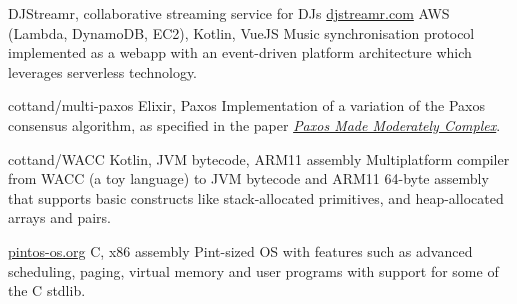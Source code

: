 \begin{entrylist}
    \projEntry
    {DJStreamr, collaborative streaming service for DJs}
    {\href{https://djstreamr.com}{djstreamr.com}}
    {AWS (Lambda, DynamoDB, EC2), Kotlin, VueJS}
    {
        Music synchronisation protocol implemented as a webapp with an event-driven platform
        architecture which leverages serverless technology.
    }

    {cottand/multi-paxos}
    {Elixir, Paxos}
    {
        Implementation of a variation of the Paxos consensus algorithm, as specified in the paper
    \href{https://dl.acm.org/citation.cfm?id=2673577}{\textit{Paxos Made Moderately Complex}}.
    }

    {cottand/WACC}
    {Kotlin, JVM bytecode, ARM11 assembly}
    {
        Multiplatform compiler from WACC (a toy language) to JVM bytecode and ARM11 64-byte assembly
    that supports basic constructs like stack-allocated primitives, and heap-allocated arrays
    and pairs.
    }

    {\href{https://pintos-os.org/}{pintos-os.org}}
    {C, x86 assembly}
    {
        Pint-sized OS with features such as advanced scheduling, paging, virtual memory and user
    programs with support for some of the C stdlib.
    }




\end{entrylist}

